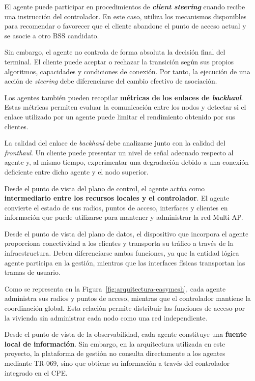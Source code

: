 El agente puede participar en procedimientos de
\textbf{\textit{client steering}} cuando recibe una instrucción del
controlador. En este caso, utiliza los mecanismos disponibles para
recomendar o favorecer que el cliente abandone el punto de acceso actual
y se asocie a otro BSS candidato.

Sin embargo, el agente no controla de forma absoluta la decisión final
del terminal. El cliente puede aceptar o rechazar la transición según sus
propios algoritmos, capacidades y condiciones de conexión. Por tanto, la
ejecución de una acción de \textit{steering} debe diferenciarse del
cambio efectivo de asociación.

Los agentes también pueden recopilar
\textbf{métricas de los enlaces de \textit{backhaul}}. Estas métricas
permiten evaluar la comunicación entre los nodos y detectar si el enlace
utilizado por un agente puede limitar el rendimiento obtenido por sus
clientes.

La calidad del enlace de \textit{backhaul} debe analizarse junto con la
calidad del \textit{fronthaul}. Un cliente puede presentar un nivel de
señal adecuado respecto al agente y, al mismo tiempo, experimentar una
degradación debido a una conexión deficiente entre dicho agente y el nodo
superior.

Desde el punto de vista del plano de control, el agente actúa como
\textbf{intermediario entre los recursos locales y el controlador}. El
agente convierte el estado de sus radios, puntos de acceso, interfaces y
clientes en información que puede utilizarse para mantener y administrar
la red Multi-AP.

Desde el punto de vista del plano de datos, el dispositivo que incorpora
el agente proporciona conectividad a los clientes y transporta su tráfico
a través de la infraestructura. Deben diferenciarse ambas funciones, ya
que la entidad lógica agente participa en la gestión, mientras que las
interfaces físicas transportan las tramas de usuario.

Como se representa en la
Figura~\ref{fig:arquitectura-easymesh}, cada agente administra sus radios
y puntos de acceso, mientras que el controlador mantiene la coordinación
global. Esta relación permite distribuir las funciones de acceso por la
vivienda sin administrar cada nodo como una red independiente.

Desde el punto de vista de la observabilidad, cada agente constituye una
\textbf{fuente local de información}. Sin embargo, en la arquitectura
utilizada en este proyecto, la plataforma de gestión no consulta
directamente a los agentes mediante TR-069, sino que obtiene su
información a través del controlador integrado en el CPE.

